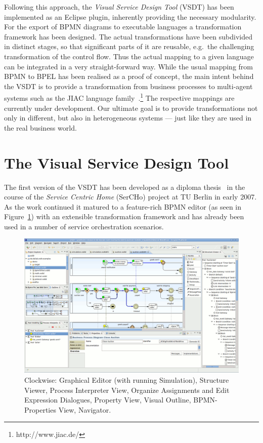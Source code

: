 Following this approach, the \emph{Visual Service Design Tool} (VSDT) has been implemented as an Eclipse plugin, inherently providing the necessary modularity.  For the export of BPMN diagrams to executable languages a transformation framework has been designed.  The actual transformations have been subdivided in distinct stages, so that significant parts of it are reusable, e.g.\ the challenging transformation of the control flow.  Thus the actual mapping to a given language can be integrated in a very straight-forward way.  While the usual mapping from BPMN to BPEL has been realised as a proof of concept, the main intent behind the VSDT is to provide a transformation from business processes to multi-agent systems such as the JIAC language family~\cite{Hirsch2009Multi-Agent}.\footnote{http://www.jiac.de/}  The respective mappings are currently under development.  Our ultimate goal is to provide transformations not only in different, but also in heterogeneous systems --- just like they are used in the real business world.



\section{The Visual Service Design Tool}
\label{sec:intro_vsdt}

The first version of the VSDT has been developed as a diploma thesis~\cite{kuester2007development} in the course of the \emph{Service Centric Home} (SerCHo) project at TU Berlin in early 2007.  As the work continued it matured to a feature-rich BPMN editor (as seen in Figure~\ref{fig:screen}) with an extensible transformation framework and has already been used in a number of service orchestration scenarios.

\begin{figure}
	\centering
	\includegraphics[height=.4\textheight]{figures/vsdt_1-3-0.png}
	\caption{Clockwise: Graphical Editor (with running Simulation), Structure Viewer, Process Interpreter View, Organize Assignments and Edit Expression Dialogues, Property View, Visual Outline, BPMN-Properties View, Navigator.}
	\label{fig:screen}
\end{figure}


